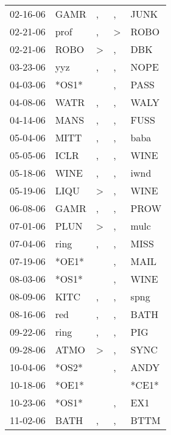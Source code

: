 \begin{supertabular}{lllll}
 02-16-06 &   GAMR &                , &                , &   JUNK \\
 02-21-06 &   prof &                , &     \textgreater &   ROBO \\
 02-21-06 &   ROBO &     \textgreater &                , &    DBK \\
 03-23-06 &    yyz &                , &                , &   NOPE \\
 04-03-06 &  *OS1* &                  &                , &   PASS \\
 04-08-06 &   WATR &                , &                , &   WALY \\
 04-14-06 &   MANS &                , &                , &   FUSS \\
 05-04-06 &   MITT &                , &                , &   baba \\
 05-05-06 &   ICLR &                , &                , &   WINE \\
 05-18-06 &   WINE &                , &                , &   iwnd \\
 05-19-06 &   LIQU &     \textgreater &                , &   WINE \\
 06-08-06 &   GAMR &                , &                , &   PROW \\
 07-01-06 &   PLUN &     \textgreater &                , &   mulc \\
 07-04-06 &   ring &                , &                , &   MISS \\
 07-19-06 &  *OE1* &                  &                , &   MAIL \\
 08-03-06 &  *OS1* &                  &                , &   WINE \\
 08-09-06 &   KITC &                , &                , &   spng \\
 08-16-06 &    red &                , &                , &   BATH \\
 09-22-06 &   ring &                , &                , &    PIG \\
 09-28-06 &   ATMO &     \textgreater &                , &   SYNC \\
 10-04-06 &  *OS2* &                  &                , &   ANDY \\
 10-18-06 &  *OE1* &                  &                  &  *CE1* \\
 10-23-06 &  *OS1* &                  &                , &    EX1 \\
 11-02-06 &   BATH &                , &                , &   BTTM \\

\end{supertabular}

